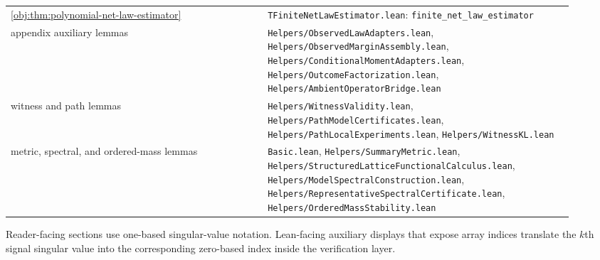 \begin{center}
\begin{tabular}{p{0.42\linewidth}p{0.5\linewidth}}
\cref{obj:thm:polynomial-net-law-estimator} & \texttt{TFiniteNetLawEstimator.lean}: \texttt{finite\_net\_law\_estimator}\\
appendix auxiliary lemmas & \texttt{Helpers/ObservedLawAdapters.lean}, \texttt{Helpers/ObservedMarginAssembly.lean}, \texttt{Helpers/ConditionalMomentAdapters.lean}, \texttt{Helpers/OutcomeFactorization.lean}, \texttt{Helpers/AmbientOperatorBridge.lean}\\
witness and path lemmas & \texttt{Helpers/WitnessValidity.lean}, \texttt{Helpers/PathModelCertificates.lean}, \texttt{Helpers/PathLocalExperiments.lean}, \texttt{Helpers/WitnessKL.lean}\\
metric, spectral, and ordered-mass lemmas & \texttt{Basic.lean}, \texttt{Helpers/SummaryMetric.lean}, \texttt{Helpers/StructuredLatticeFunctionalCalculus.lean}, \texttt{Helpers/ModelSpectralConstruction.lean}, \texttt{Helpers/RepresentativeSpectralCertificate.lean}, \texttt{Helpers/OrderedMassStability.lean}\\
\end{tabular}
\end{center}

Reader-facing sections use one-based singular-value notation. Lean-facing auxiliary displays that expose array indices translate the \(k\)th signal singular value into the corresponding zero-based index inside the verification layer.
